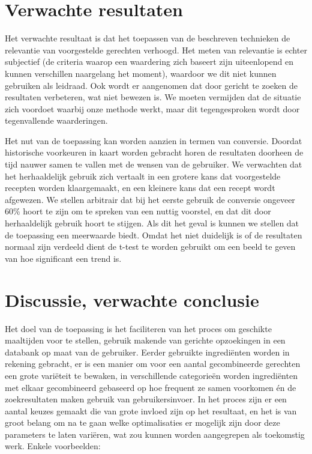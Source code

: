 \documentclass{hogent-article}
\begin{document}
\section{Verwachte resultaten}%
\label{sec:verwachte-resultaten}


Het verwachte resultaat is dat het toepassen van de beschreven technieken de relevantie van voorgestelde gerechten verhoogd. Het meten van relevantie is echter subjectief (de criteria waarop een waardering zich baseert zijn uiteenlopend en kunnen verschillen naargelang het moment), waardoor we dit niet kunnen gebruiken als leidraad. Ook wordt er aangenomen dat door gericht te zoeken de resultaten verbeteren, wat niet bewezen is. We moeten vermijden dat de situatie zich voordoet waarbij onze methode werkt, maar dit tegengesproken wordt door tegenvallende waarderingen. 

Het nut van de toepassing kan worden aanzien in termen van conversie. Doordat historische voorkeuren in kaart worden gebracht horen de resultaten doorheen de tijd nauwer samen te vallen met de wensen van de gebruiker. We verwachten dat het herhaaldelijk gebruik zich vertaalt in een grotere kans dat voorgestelde recepten worden klaargemaakt, en een kleinere kans dat een recept wordt afgewezen. We stellen arbitrair dat bij het eerste gebruik de conversie ongeveer 60\% hoort te zijn om te spreken van een nuttig voorstel, en dat dit door herhaaldelijk gebruik hoort te stijgen. Als dit het geval is kunnen we stellen dat de toepassing een meerwaarde biedt. Omdat het niet duidelijk is of de resultaten normaal zijn verdeeld dient de t-test te worden gebruikt om een beeld te geven van hoe significant een trend is.

\section{Discussie, verwachte conclusie}%
\label{sec:discussie-conclusie}

Het doel van de toepassing is het faciliteren van het proces om geschikte maaltijden voor te stellen, gebruik makende van gerichte opzoekingen in een databank op maat van de gebruiker. Eerder gebruikte ingrediënten worden in rekening gebracht, er is een manier om voor een aantal gecombineerde gerechten een grote variëteit te bewaken, in verschillende categorieën worden ingrediënten met elkaar gecombineerd gebaseerd op hoe frequent ze samen voorkomen én de zoekresultaten maken gebruik van gebruikersinvoer. In het proces zijn er een aantal keuzes gemaakt die van grote invloed zijn op het resultaat, en het is van groot belang om na te gaan welke optimalisaties er mogelijk zijn door deze parameters te laten variëren, wat zou kunnen worden aangegrepen als toekomstig werk. Enkele voorbeelden:
\end{document}
